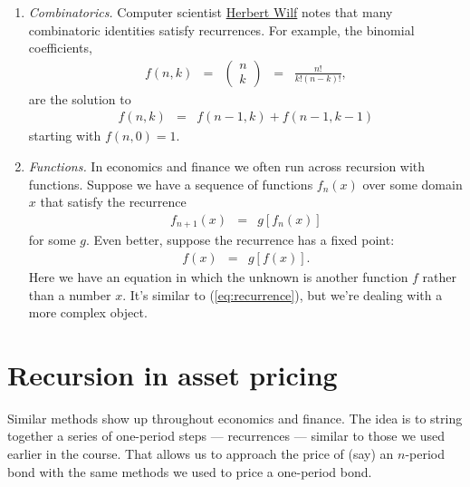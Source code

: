 \documentclass[11pt]{article}
\begin{document}
\begin{enumerate}
\item {\it Combinatorics.\/}
Computer scientist
\href{http://www.math.upenn.edu/~wilf/DownldGF.html}{Herbert Wilf}
notes that many combinatoric identities satisfy recurrences.
For example, the binomial coefficients,
\begin{eqnarray*}
    f(n,k) &=&  \left( \begin{array}{c} n \\ k \end{array}\right)
            \;\;=\;\;  \frac{n!}{k!(n-k)!} ,
\end{eqnarray*}
are the solution to
\begin{eqnarray*}
    f(n,k) &=&  f(n-1,k) + f(n-1,k-1)
\end{eqnarray*}
starting with $ f(n,0) = 1$.  %

\item {\it Functions.\/}
In economics and finance we often run across recursion with functions.
Suppose we have a sequence of functions $f_n(x)$ over some
domain $x$ that satisfy the recurrence
\begin{eqnarray*}
    f_{n+1}(x) &=& g[f_n(x)]
\end{eqnarray*}
for some $g$.
Even better, suppose the recurrence has a fixed point:
\begin{eqnarray*}
    f(x) &=& g[f(x)] .
\end{eqnarray*}
Here we have an equation in which the unknown is another function $f$
rather than a number $x$.
It's similar to (\ref{eq:recurrence}), but we're dealing with a more complex object.

\end{enumerate}



\section{Recursion in asset pricing}

Similar methods show up throughout economics and finance.
The idea is to string together a series of one-period
steps --- recurrences --- similar to those we used earlier in the course.
That allows us to approach the price of (say) an $n$-period bond
with the same methods we used to price a one-period bond.
\end{document}
